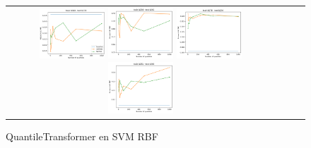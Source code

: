 \begin{figure}[h!]
\begin{tabular}{cccc}
  \includegraphics[width=0.25\textwidth]{Kap4/kFigure_5.png}  \includegraphics[width=0.25\textwidth]{Kap4/kFigure_6.png}
  \includegraphics[width=0.25\textwidth]{Kap4/kFigure_8.png}  \includegraphics[width=0.25\textwidth]{Kap4/kFigure_7.png} 
\end{tabular}
\caption{QuantileTransformer en SVM RBF}
\label{fig:svmk_quantiles}
\end{figure}


